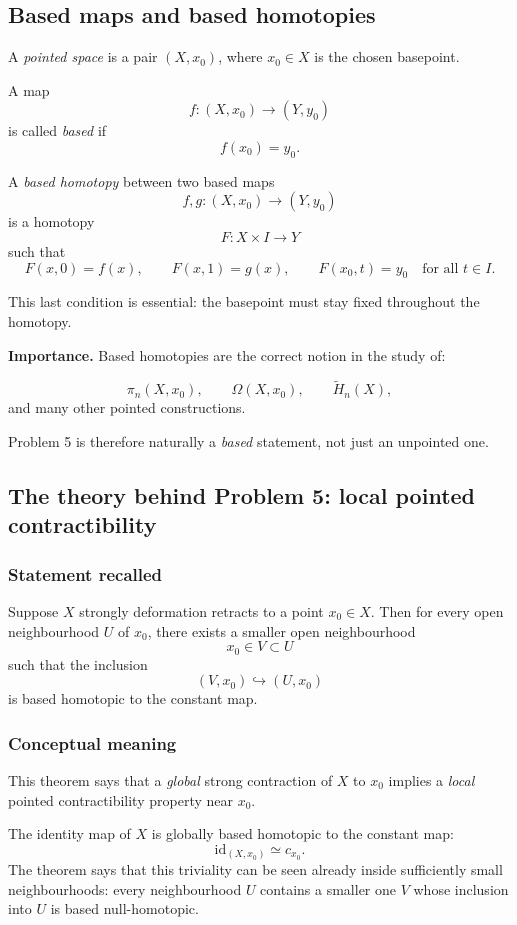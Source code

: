\documentclass[12pt,a4paper]{article}
\theoremstyle{notespace}
\begin{document}
\subsection{Based maps and based homotopies}

A \emph{pointed space} is a pair \((X,x_0)\), where \(x_0\in X\) is the chosen basepoint.

A map
\[
f:(X,x_0)\to (Y,y_0)
\]
is called \emph{based} if
\[
f(x_0)=y_0.
\]

A \emph{based homotopy} between two based maps
\[
f,g:(X,x_0)\to (Y,y_0)
\]
is a homotopy
\[
F:X\times I\to Y
\]
such that
\[
F(x,0)=f(x),
\qquad
F(x,1)=g(x),
\qquad
F(x_0,t)=y_0
\quad\text{for all }t\in I.
\]

This last condition is essential: the basepoint must stay fixed throughout the homotopy.

\medskip

\textbf{Importance.}
Based homotopies are the correct notion in the study of:

\[
\pi_n(X,x_0),
\qquad
\Omega(X,x_0),
\qquad
\widetilde{H}_n(X),
\]
and many other pointed constructions.

Problem 5 is therefore naturally a \emph{based} statement, not just an unpointed one.

\subsection{The theory behind Problem 5: local pointed contractibility}

\subsubsection{Statement recalled}

Suppose \(X\) strongly deformation retracts to a point \(x_0\in X\). Then for every open neighbourhood \(U\) of \(x_0\), there exists a smaller open neighbourhood
\[
x_0\in V\subset U
\]
such that the inclusion
\[
(V,x_0)\hookrightarrow (U,x_0)
\]
is based homotopic to the constant map.

\subsubsection{Conceptual meaning}

This theorem says that a \emph{global} strong contraction of \(X\) to \(x_0\) implies a \emph{local} pointed contractibility property near \(x_0\).

The identity map of \(X\) is globally based homotopic to the constant map:
\[
\mathrm{id}_{(X,x_0)} \simeq c_{x_0}.
\]
The theorem says that this triviality can be seen already inside sufficiently small neighbourhoods: every neighbourhood \(U\) contains a smaller one \(V\) whose inclusion into \(U\) is based null-homotopic.
\end{document}
